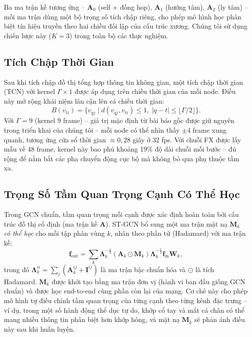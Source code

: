\documentclass[conference]{IEEEtran}
\begin{document}
Ba ma trận kề tương ứng -- $\mathbf{A}_0$ (self + đồng hop),
$\mathbf{A}_1$ (hướng tâm), $\mathbf{A}_2$ (ly tâm) -- mỗi ma trận
dùng một bộ trọng số tích chập riêng, cho phép mô hình học phân biệt
tín hiệu truyền theo hai chiều đối lập của cấu trúc xương. Chúng tôi
sử dụng chiến lược này ($K = 3$) trong toàn bộ các thực nghiệm.

\subsection{Tích Chập Thời Gian}
\label{sec:tcn}

Sau khi tích chập đồ thị tổng hợp thông tin không gian, một tích chập
thời gian (TCN) với kernel $\Gamma \times 1$ được áp dụng trên chiều
thời gian của mỗi node. Điều này mở rộng khái niệm lân cận lên cả chiều
thời gian:
\begin{equation}
  B(v_{ti}) = \bigl\{v_{qj} \mid d(v_{qj}, v_{ti}) \leq 1,\;
              |q - t| \leq \lfloor\Gamma/2\rfloor\bigr\}.
\end{equation}
Với $\Gamma = 9$ (kernel 9 frame) -- giá trị mặc định từ bài báo gốc
được giữ nguyên trong triển khai của chúng tôi -- mỗi node có thể nhìn
thấy $\pm 4$ frame xung quanh, tương ứng cửa sổ thời gian $\approx
0{,}28$ giây ở 32 fps. Với chuỗi FX được lấy mẫu về 48 frame, kernel
này bao phủ khoảng 19\% độ dài chuỗi mỗi bước -- đủ rộng để nắm bắt
các pha chuyển động cục bộ mà không bỏ qua phụ thuộc tầm xa.

\subsection{Trọng Số Tầm Quan Trọng Cạnh Có Thể Học}
\label{sec:edge_weight}

Trong GCN chuẩn, tầm quan trọng mỗi cạnh được xác định hoàn toàn bởi
cấu trúc đồ thị cố định (ma trận kề $\mathbf{A}$). ST-GCN bổ sung
một ma trận mặt nạ $\mathbf{M}_k$ \textit{có thể học} cho mỗi tập phân
vùng $k$, nhân theo phần tử (Hadamard) với ma trận kề:
\begin{equation}
  \mathbf{f}_{\text{out}} =
    \sum_k \mathbf{\Lambda}_k^{-\frac{1}{2}}
    (\mathbf{A}_k \odot \mathbf{M}_k)
    \mathbf{\Lambda}_k^{-\frac{1}{2}}
    \mathbf{f}_{\text{in}} \mathbf{W}_k,
\label{eq:edge_mask}
\end{equation}
trong đó $\mathbf{\Lambda}_k^{ii} = \sum_j (\mathbf{A}_k^{ij} +
\mathbf{I}^{ij})$ là ma trận bậc chuẩn hóa và $\odot$ là tích Hadamard.
$\mathbf{M}_k$ được khởi tạo bằng ma trận đơn vị (hành vi ban đầu giống
GCN chuẩn) và được học end-to-end cùng phần còn lại của mạng. Cơ chế
này cho phép mô hình tự điều chỉnh tầm quan trọng của từng cạnh theo
từng kênh đặc trưng -- ví dụ, trong một số hành động thể dục tự do,
khớp cổ tay và mắt cá chân có thể mang nhiều thông tin phân biệt hơn
khớp hông, và mặt nạ $\mathbf{M}_k$ sẽ phản ánh điều này sau khi huấn
luyện.
\end{document}
